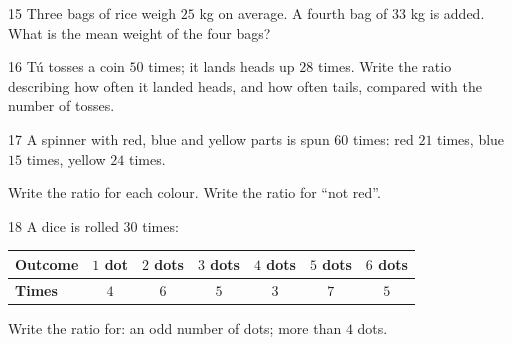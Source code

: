 \gap
\begin{probbox}{15}{\relax}
Three bags of rice weigh $25$ kg on average. A fourth bag of $33$ kg is added. What is the mean weight of the four bags?
\end{probbox}
\gap
\begin{probbox}{16}{\relax}
Tú tosses a coin $50$ times; it lands heads up $28$ times. Write the ratio describing how often it landed heads, and how often tails, compared with the number of tosses.
\end{probbox}
\gap
\begin{probbox}{17}{\relax}
A spinner with red, blue and yellow parts is spun $60$ times: red $21$ times, blue $15$ times, yellow $24$ times.\par
{} Write the ratio for each colour. \quad {} Write the ratio for ``not red''.
\end{probbox}
\gap
\needspace{5cm}
\begin{probbox}{18}{\relax}
A dice is rolled $30$ times:
\begin{center}
\begin{tabular}{|l|c|c|c|c|c|c|}
\hline
\textbf{Outcome} & $1$ dot & $2$ dots & $3$ dots & $4$ dots & $5$ dots & $6$ dots\\\hline
\textbf{Times} & $4$ & $6$ & $5$ & $3$ & $7$ & $5$\\\hline
\end{tabular}
\end{center}
Write the ratio for:  an odd number of dots; \quad {} more than $4$ dots.
\end{probbox}
